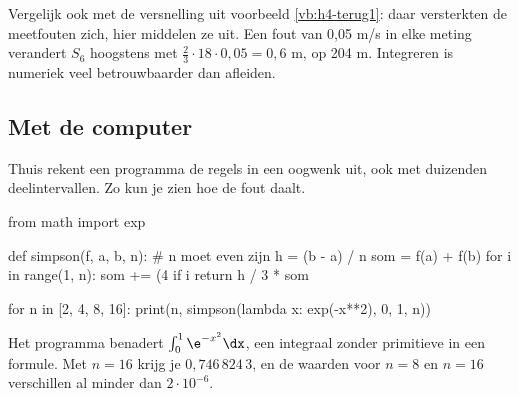 Vergelijk ook met de versnelling uit voorbeeld \ref{vb:h4-terug1}: daar versterkten de meetfouten zich, hier middelen ze uit. Een fout van 0,05 m/s in elke meting verandert $S_6$ hoogstens met $\frac23 \cdot 18 \cdot 0{,}05 = 0{,}6$ m, op 204 m. Integreren is numeriek veel betrouwbaarder dan afleiden.


\subsection{Met de computer}

Thuis rekent een programma de regels in een oogwenk uit, ook met duizenden deelintervallen. Zo kun je zien hoe de fout daalt.

\begin{python}
from math import exp

def simpson(f, a, b, n):          # n moet even zijn
    h = (b - a) / n
    som = f(a) + f(b)
    for i in range(1, n):
        som += (4 if i %
    return h / 3 * som

for n in [2, 4, 8, 16]:
    print(n, simpson(lambda x: exp(-x**2), 0, 1, n))
\end{python}

Het programma benadert $\int_0^1 \e^{-x^2}\dx$, een integraal zonder primitieve in een formule. Met $n = 16$ krijg je $0{,}746\,824\,3$, en de waarden voor $n = 8$ en $n = 16$ verschillen al minder dan $2 \cdot 10^{-6}$.

\opdrachtenkop

\begin{oefeningen}




















\end{oefeningen}

